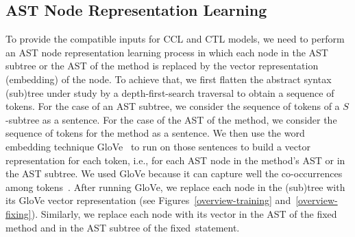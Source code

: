 \subsection{AST Node Representation Learning}

To provide the compatible inputs for CCL and CTL models, we need to
perform an AST node representation learning process in which each node
in the AST subtree or the AST of the method is replaced by the vector
representation (embedding) of the node. To achieve that, we first
flatten the abstract syntax (sub)tree under study by a
depth-first-search traversal to obtain a sequence of tokens. For the
case of an AST subtree, we consider the sequence of tokens of a
$S$-subtree as a sentence. For the case of the AST of the method, we
consider the sequence of tokens for the method as a sentence. We then
use the word embedding technique GloVe~\cite{pennington2014glove}
to run on those sentences to build a vector representation for each
token, i.e., for each AST node in the method's AST or in the AST
subtree. We used GloVe because it can capture well the co-occurrences
among tokens~\cite{pennington2014glove}. After running GloVe, we
replace each node in the (sub)tree with its GloVe vector
representation (see Figures~\ref{overview-training}
and~\ref{overview-fixing}). Similarly, we replace each node with its
vector in the AST of the fixed method and in the AST subtree of the
fixed~statement.


